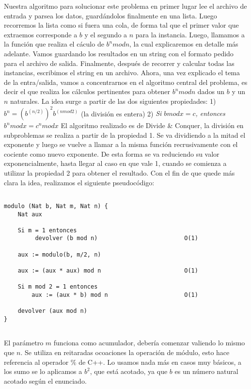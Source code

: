 Nuestra algoritmo para solucionar este problema en primer lugar lee el archivo de entrada y parsea los datos, guardándolos finalmente en una lista. Luego recorremos la lista como si fuera una cola, de forma tal que el primer valor que extraemos corresponde a $b$ y el segundo a $n$ para la instancia.
Luego, llamamos a la función que realiza el cáculo de \emph{$b^n mod n$}, la cual explicaremos en detalle más adelante. Vamos guardando los resultados en un string con el formato pedido para el archivo de salida. Finalmente, después de recorrer y calcular todas las instancias, escribimos el string en un archivo.
\newline
Ahora, una vez explicado el tema de la entra/salida, vamos a concentrarnos en el algoritmo central del problema, es decir el que realiza los cálculos pertinentes para obtener \emph{$b^n mod n$} dados un $b$ y un $n$ naturales. La idea surge a partir de las dos siguientes propiedades:
1) \emph{$b^n = (b^(n/2))^2 b^(n mod 2)$} (la división es entera)
2) \emph{Si $b mod x = c$, entonces $b^n mod x = c^n mod x$}
\newline
El algoritmo realizado es de Divide & Conquer, la división en subproblemas se realiza a partir de la propiedad 1. Se va dividiendo a la mitad el exponente y luego se vuelve a llamar a la misma función recrusivamente con el cociente como nuevo exponente. De esta forma se va reduciendo su valor exponencialmente, hasta llegar al caso en que vale 1, cuando se comienza a utilizar la propiedad 2 para obtener el resultado.
\newline
Con el fin de que quede más clara la idea, realizamos el siguiente pseudocódigo:
\begin{verbatim}
  
modulo (Nat b, Nat m, Nat n) { 
    Nat aux
    
    Si m = 1 entonces
         devolver (b mod n)                         O(1)

    aux := modulo(b, m/2, n)
    
    aux := (aux * aux) mod n                        O(1)

    Si m mod 2 = 1 entonces
        aux := (aux * b) mod n                      O(1)

    devolver (aux mod n)
}
	  
\end{verbatim}
\newline
El parámetro $m$ funciona como acumulador, debería comenzar valiendo lo mismo que $n$. Se utiliza en reitaradas ocoaciones la operación de módulo, esto hace referencia al operador $\%$ de C++. Lo usamos nada más en casos muy básicos, a los sumo se lo aplicamos a $b^2$, que está acotado, ya que $b$ es un número natural acotado según el enunciado. 
